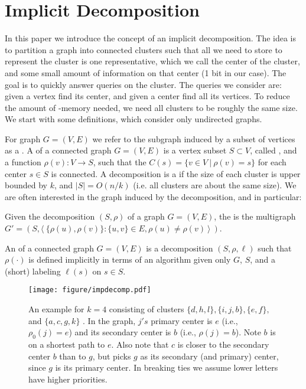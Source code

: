 \section{Implicit Decomposition}\label{sec:implicit}

In this paper we introduce the concept of an implicit decomposition.
The idea is to partition a graph into connected clusters such that all we need to store to
represent the cluster is one representative, which we call the
center of the cluster, and some small amount of information on that
center (1 bit in our case).  The goal is to
quickly answer queries on the cluster.  The queries we consider are:
given a vertex find its center, and given a center
find all its vertices.  To reduce the amount of \local-memory
needed, we need all clusters to be roughly the same size.
We start with some definitions, which consider only undirected
graphs.

For graph $G = (V,E)$ we refer to the subgraph induced by a subset of
vertices as a .  A  of a connected
graph $G=(V,E)$ is a vertex subset $S\subset V$, called
, and a function $\rho(v):V\to S$, such that the
 $C(s) = \{v \in V~|~\rho(v) = s\}$ for each center $s \in S$
is connected.  A decomposition is a  if the
size of each cluster is upper bounded by $k$, and $|S|=O(n/k)$
(i.e. all clusters are about the same size).
We are often interested in the graph induced by the
decomposition, and in particular:
\begin{definition}[\clustergraph]
Given the decomposition $(S,\rho)$ of a graph $G = (V,E)$, the  is the multigraph $G' = (S,\langle\ \{\rho(u),
    \rho(v)\} : \{u,v\} \in E, \rho(u) \neq \rho(v)\ \rangle\ )$.
\end{definition}

\begin{definition}
An  of a connected graph
$G=(V,E)$ is a decomposition $(S,\rho,\ell)$ such that $\rho(\cdot)$ is
defined implicitly in terms of an algorithm given only $G$, $S$, and a
(short) labeling $\ell(s)$ on $s \in S$.
\end{definition}

\begin{figure}[t]
\centering
  \texttt{[image: figure/impdecomp.pdf]}
  \vspace{.05in}
\caption{An example \implicit{} for $k = 4$ consisting of clusters $\{d,h,l\}, \{i,j,b\},\{e,f\},$ and $\{a,c,g,k\}$  .  In the graph,
  $j's$ primary center is $e$ (i.e., $\rho_0(j) = e$) and its
  secondary center is $b$ (i.e., $\rho(j) = b$).   Note $b$ is on a
  shortest path to $e$.   Also note that $c$ is closer to the
  secondary center $b$ than to $g$, but picks $g$ as its secondary
  (and primary) center, since $g$ is its primary center.  In breaking
  ties we assume lower letters have higher priorities.}
\label{fig:cluster}
 \end{figure}

